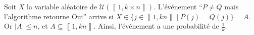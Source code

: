 \begin{enumerate}
		Soit $X$\/ la variable aléatoire de $\mathcal{U}(\left\llbracket 1,k\times n \right\rrbracket)$.
		L'événement ``$P \neq Q$\/ mais l'algorithme retourne {\sc Oui}'' arrive si $X \in \{j \in \left\llbracket 1,kn \right\rrbracket  \mid P(j) = Q(j)\} = A$. Or $|A| \le n$, et $A \subseteq \left\llbracket 1,kn \right\rrbracket$. Ainsi, l'événement a une probabilité de $\frac{1}{k}$.
\end{enumerate}

